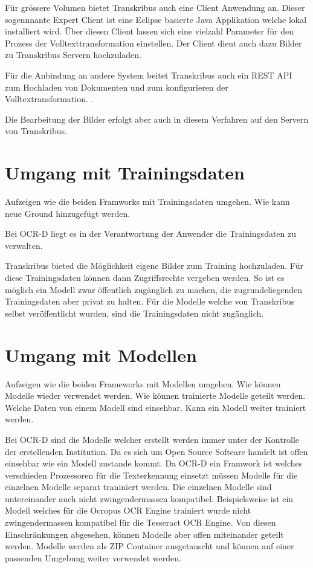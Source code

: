 \documentclass[a4paper,oneside, 12pt]{report}
\begin{document}
Für grössere Volumen bietet Transkribus auch eine Client Anwendung an. Dieser sogennnante Expert Client ist eine Eclipse basierte Java Applikation welche lokal installiert wird. Über diesen Client lassen sich eine vielzahl Parameter für den Prozess der Volltexttransformation einstellen. Der Client dient auch dazu Bilder zu Transkribus Servern hochzuladen. \cite{transkribusclient}

Für die Anbindung an andere System beitet Transkribus auch ein REST API zum Hochladen von Dokumenten und zum konfigurieren der Volltextransformation. \cite{transkribusapi}. 

Die Bearbeitung der Bilder erfolgt aber auch in diesem Verfahren auf den Servern von Transkribus.

\section{Umgang mit Trainingsdaten}
Aufzeigen wie die beiden Framworks mit Trainingsdaten umgehen. Wie kann neue Ground hinzugefügt werden.

Bei OCR-D liegt es in der Verantwortung der Anwender die Trainingsdaten zu verwalten. 

Transkribus bieted die Möglichkeit eigene Bilder zum Training hochzuladen. Für diese Trainingsdaten können dann Zugriffsrechte vergeben werden. So ist es möglich ein Modell zwar öffentlich zugänglich zu machen, die zugrundeliegenden Trainingsdaten aber privat zu halten. Für die Modelle welche von Transkribus selbst veröffentlicht wurden, sind die Trainingsdaten nicht zugänglich.

\section{Umgang mit Modellen}
Aufzeigen wie die beiden Frameworks mit Modellen umgehen. Wie können Modelle wieder verwendet werden. Wie können trainierte Modelle geteilt werden. Welche Daten von einem Modell sind einsehbar. Kann ein Modell weiter trainiert werden.

Bei OCR-D sind die Modelle welcher erstellt werden immer unter der Kontrolle der erstellenden Institution. Da es sich um Open Source Softeare handelt ist offen einsehbar wie ein Modell zustande kommt. Da OCR-D ein Framwork ist welches verschieden Prozessoren für die Texterkennung einsetzt müssen Modelle für die einzelnen Modelle separat traniniert werden. Die einzelnen Modelle sind untereinander auch nicht zwingendermassen kompatibel. Beispielsweise ist ein Modell welches für die Ocropus OCR Engine trainiert wurde nicht zwingendermassen kompatibel für die Tesseract OCR Engine. Von diesen Einschränkungen abgesehen, können Modelle aber offen miteinander geteilt werden. Modelle werden als ZIP Container ausgetauscht und können auf einer passenden Umgebung weiter verwendet werden.
\end{document}
